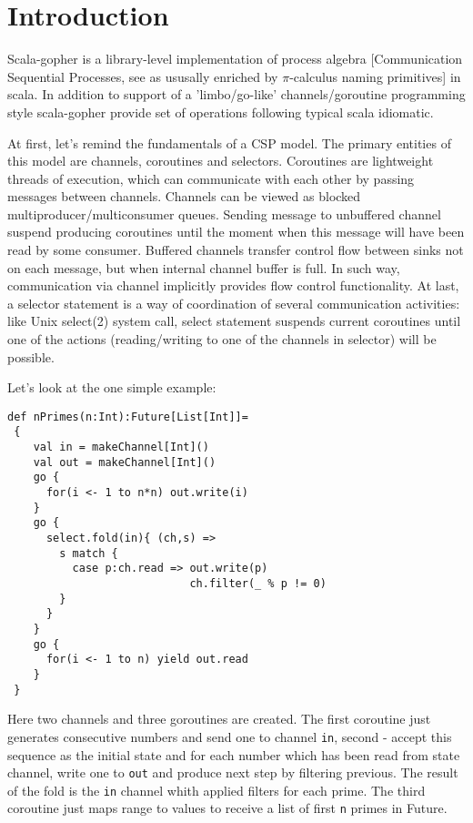 \documentclass[12pt]{article}
\begin{document}
\maketitle


\section{Introduction}

 Scala-gopher is a library-level implementation of process algebra [Communication Sequential Processes, see \cite{Hoare85communicatingsequential} as ususally enriched by $\pi$-calculus \cite{Milner:1992:CMP:162037.162038} naming primitives] in scala. In addition to support of a 'limbo/go-like' \cite{Inferno:Limbo}  \cite{golang} channels/goroutine programming style scala-gopher provide set of operations following typical scala idiomatic. 

    At first, let's remind the fundamentals of a CSP model. The primary entities of this model are channels, coroutines and selectors. Coroutines are lightweight threads of execution, which can communicate with each other by passing messages between channels. Channels can be viewed as blocked multiproducer/multiconsumer queues. Sending message to unbuffered channel suspend producing coroutines until the moment when this message will have been read by some consumer. Buffered channels transfer control flow between sinks not on each message, but when internal channel buffer is full.  
In such way, communication via channel implicitly provides flow control functionality.  At last, a selector statement is a way of coordination of several communication activities: like Unix select(2) system call, select statement suspends current coroutines until one of the actions (reading/writing to one of the channels in selector) will be possible.

   Let's look at the one simple example:
\begin{Verbatim}[fontsize=\small]
 def nPrimes(n:Int):Future[List[Int]]=
 {
    val in = makeChannel[Int]()
    val out = makeChannel[Int]()
    go {
      for(i <- 1 to n*n) out.write(i)
    }
    go {
      select.fold(in){ (ch,s) =>
        s match {
          case p:ch.read => out.write(p)
                            ch.filter(_ % p != 0)
        }
      }
    }
    go {
      for(i <- 1 to n) yield out.read
    }
 }
\end{Verbatim}
  Here two channels and three goroutines are created.  The first coroutine just generates consecutive numbers and send one to channel \verb|in|, second - accept this sequence as the initial state and for each number which has been read from state channel, write one to \verb|out| and produce next step by filtering previous. The result of the fold is the \verb|in| channel whith applied filters for each prime. The third coroutine just maps range to values to receive a list of first \verb|n| primes in Future.
\end{document}

